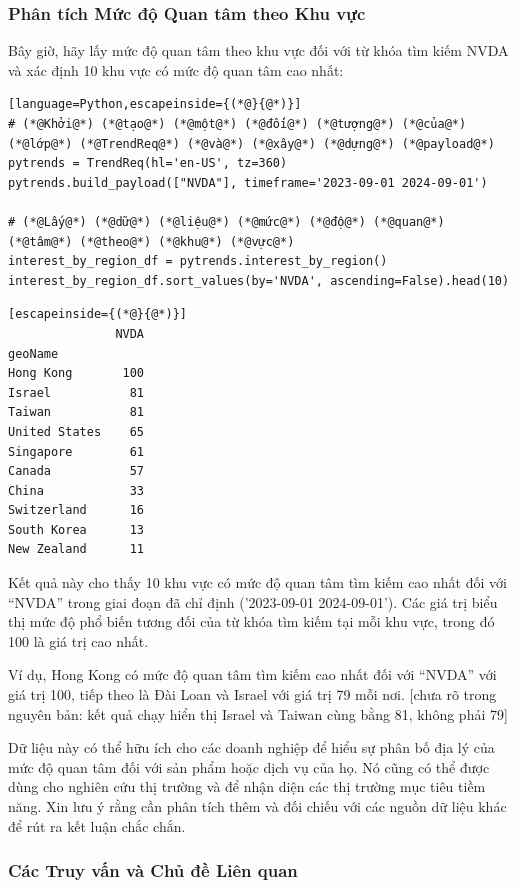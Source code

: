 \subsubsection*{Phân tích Mức độ Quan tâm theo Khu vực}

Bây giờ, hãy lấy mức độ quan tâm theo khu vực đối với từ khóa tìm kiếm NVDA và xác định 10 khu vực có mức độ quan tâm cao nhất:

\begin{lstlisting}[language=Python,escapeinside={(*@}{@*)}]
# (*@Khởi@*) (*@tạo@*) (*@một@*) (*@đối@*) (*@tượng@*) (*@của@*) (*@lớp@*) (*@TrendReq@*) (*@và@*) (*@xây@*) (*@dựng@*) (*@payload@*)
pytrends = TrendReq(hl='en-US', tz=360)
pytrends.build_payload(["NVDA"], timeframe='2023-09-01 2024-09-01')

# (*@Lấy@*) (*@dữ@*) (*@liệu@*) (*@mức@*) (*@độ@*) (*@quan@*) (*@tâm@*) (*@theo@*) (*@khu@*) (*@vực@*)
interest_by_region_df = pytrends.interest_by_region()
interest_by_region_df.sort_values(by='NVDA', ascending=False).head(10)
\end{lstlisting}

\begin{lstlisting}[escapeinside={(*@}{@*)}]
               NVDA
geoName
Hong Kong       100
Israel           81
Taiwan           81
United States    65
Singapore        61
Canada           57
China            33
Switzerland      16
South Korea      13
New Zealand      11
\end{lstlisting}

Kết quả này cho thấy 10 khu vực có mức độ quan tâm tìm kiếm cao nhất đối với ``NVDA'' trong giai đoạn đã chỉ định ('2023-09-01 2024-09-01'). Các giá trị biểu thị mức độ phổ biến tương đối của từ khóa tìm kiếm tại mỗi khu vực, trong đó 100 là giá trị cao nhất.

Ví dụ, Hong Kong có mức độ quan tâm tìm kiếm cao nhất đối với ``NVDA'' với giá trị 100, tiếp theo là Đài Loan và Israel với giá trị 79 mỗi nơi. [chưa rõ trong nguyên bản: kết quả chạy hiển thị Israel và Taiwan cùng bằng 81, không phải 79]

Dữ liệu này có thể hữu ích cho các doanh nghiệp để hiểu sự phân bố địa lý của mức độ quan tâm đối với sản phẩm hoặc dịch vụ của họ. Nó cũng có thể được dùng cho nghiên cứu thị trường và để nhận diện các thị trường mục tiêu tiềm năng. Xin lưu ý rằng cần phân tích thêm và đối chiếu với các nguồn dữ liệu khác để rút ra kết luận chắc chắn.

\subsubsection*{Các Truy vấn và Chủ đề Liên quan}

